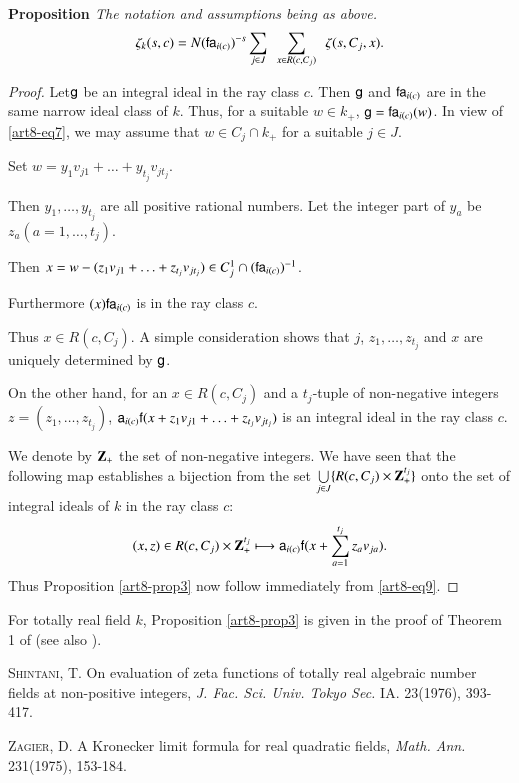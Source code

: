 \medskip
\noindent
{\bfseries Proposition \label{art8-prop3}}
\textit{The notation and assumptions being as above.}
$$
\zeta_k (s,c) = N (\mathsf{f} \mathsf{a}_{i(c)})^{-s} \sum\limits_{j \in J} ~~ \sum\limits_{x \in R (c,C_j)} ~~ \zeta (s, C_j, x).
$$

\begin{proof}
Let\pageoriginale $\mathsf{g}$ be an integral ideal in the ray class $c$. Then $\mathsf{g}$ and $\mathsf{f} \mathsf{a}_{i(c)}$ are in the same narrow ideal class of $k$. Thus, for a suitable $w \in k_+$, $\mathsf{g} = \mathsf{f} \mathsf{a}_{i(c)} (w)$. In view of \eqref{art8-eq7}, we may assume that $w \in C_j \cap k_+$ for a suitable $j \in J$.

Set $w = y_1 v_{j1} + \ldots + y_{t_j} v_{jt_j}$.

Then $y_1, \ldots, y_{t_j}$ are all positive rational numbers. Let the integer part of $y_a$ be $z_a (a=1, \ldots, t_j)$.

Then $x = w - (z_1 v_{j1} + \ldots + z_{t_j} v_{jt_j}) \in C^{1}_j\cap (\mathsf{f} \mathsf{a}_{i(c)})^{-1}$.

Furthermore $(x) \mathsf{f} \mathsf{a}_{i(c)}$ is in the ray class $c$.

Thus $x \in R (c, C_j)$. A simple consideration shows that $j$, $z_1, \ldots, z_{t_j}$ and $x$ are uniquely determined by $\mathsf{g}$.

On the other hand, for an $x \in R (c, C_j)$ and a $t_j$-tuple of non-negative integers $z = (z_1, \ldots, z_{t_j})$, $\mathsf{a}_{i(c)} \mathsf{f} (x+ z_1 v_{j1} + \ldots + z_{t_j} v_{jt_j})$ is an integral ideal in the ray class $c$.

We denote by $\mathbf{Z}_+$ the set of non-negative integers. We have seen that the following map establishes a bijection from the set $\bigcup\limits_{j \in J} \{R (c, C_j) \times \mathbf{Z}^{t_j}_+\}$ onto the set of integral ideals of $k$ in the ray class $c$:
$$
(x, z) \in R (c, C_j) \times \mathbf{Z}^{t_j}_+ \longmapsto \mathsf{a}_{i(c)} \mathsf{f} (x+ \sum\limits^{t_j}_{a=1} z_a v_{ja}).
$$
Thus Proposition \ref{art8-prop3} now follow immediately from \eqref{art8-eq9}.
\end{proof}

\begin{remark*}
For totally real field $k$, Proposition \ref{art8-prop3} is given in the proof of Theorem 1 of \cite{art8-1} (see also \cite{art8-2}).
\end{remark*}

\begin{thebibliography}{99}
 \textsc{Shintani, T.} On evaluation of zeta functions of totally real algebraic number fields at non-positive integers, \textit{J. Fac. Sci. Univ. Tokyo Sec.} IA. 23(1976), 393-417.

 \textsc{Zagier, D.} A Kronecker limit formula for real quadratic fields, \textit{Math. Ann.} 231(1975), 153-184.
\end{thebibliography}
